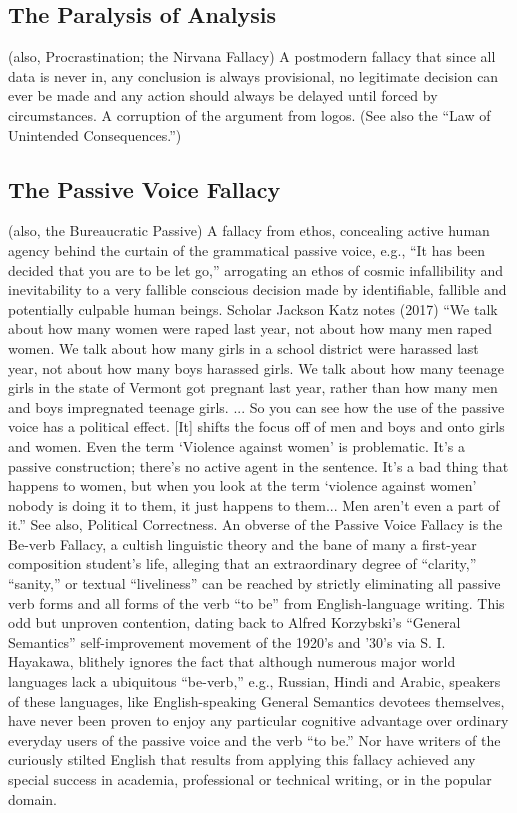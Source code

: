 \documentclass[10pt,a4paper,british]{article}
\begin{document}
\begin{multicols}{2}
    \subsection{The Paralysis of Analysis} (also, Procrastination; the Nirvana
    Fallacy) A postmodern fallacy that since all data is never in, any
    conclusion is always provisional, no legitimate decision can ever be made
    and any action should always be delayed until forced by circumstances. A
    corruption of the argument from logos. (See also the ``Law of Unintended
    Consequences.'')

	\subsection{The Passive Voice Fallacy} (also, the Bureaucratic Passive) A
	fallacy from ethos, concealing active human agency behind the curtain of
	the grammatical passive voice, e.g., ``It has been decided that you are to
	be let go,'' arrogating an ethos of cosmic infallibility and inevitability
	to a very fallible conscious decision made by identifiable, fallible and
	potentially culpable human beings. Scholar Jackson Katz notes (2017) ``We
	talk about how many women were raped last year, not about how many men
	raped women. We talk about how many girls in a school district were
	harassed last year, not about how many boys harassed girls. We talk about
	how many teenage girls in the state of Vermont got pregnant last year,
	rather than how many men and boys impregnated teenage girls. ...  So you
	can see how the use of the passive voice has a political effect. [It]
	shifts the focus off of men and boys and onto girls and women. Even the
	term `Violence against women' is problematic. It's a passive construction;
	there's no active agent in the sentence. It's a bad thing that happens to
	women, but when you look at the term `violence against women' nobody is
	doing it to them, it just happens to them... Men aren't even a part of
	it.''  See also, Political Correctness. An obverse of the Passive Voice
	Fallacy is the Be{-}verb Fallacy, a cultish linguistic theory and the bane
	of many a first{-}year composition student's life, alleging that an
	extraordinary degree of ``clarity,'' ``sanity,'' or textual ``liveliness''
	can be reached by strictly eliminating all passive verb forms and all forms
	of the verb ``to be'' from English{-}language writing. This odd but
	unproven contention, dating back to Alfred Korzybski's ``General
	Semantics'' self{-}improvement movement of the 1920's and '30's via S. I.
	Hayakawa, blithely ignores the fact that although numerous major world
	languages lack a ubiquitous ``be{-}verb,'' e.g., Russian, Hindi and Arabic,
	speakers of these languages, like English{-}speaking General Semantics
	devotees themselves, have never been proven to enjoy any particular
	cognitive advantage over ordinary everyday users of the passive voice and
	the verb ``to be.'' Nor have writers of the curiously stilted English that
	results from applying this fallacy achieved any special success in
	academia, professional or technical writing, or in the popular domain.


\end{multicols}
\end{document}
